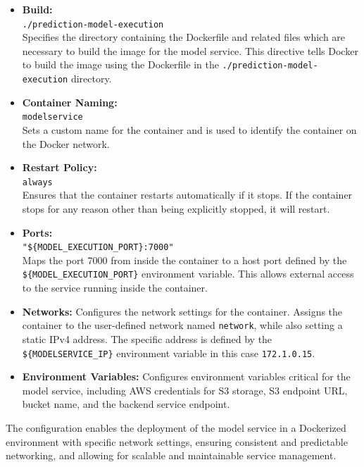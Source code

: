 \begin{itemize}
    \item \textbf{Build:} \\ \verb|./prediction-model-execution| \\ Specifies the directory containing the Dockerfile and related files which are necessary to build the image for the model service. This directive tells Docker to build the image using the Dockerfile in the \texttt{./prediction-model-execution} directory.

    \item \textbf{Container Naming:} \\ \verb|modelservice| \\ Sets a custom name for the container and is used to identify the container on the Docker network.

    \item \textbf{Restart Policy:} \\ \verb|always| \\ Ensures that the container restarts automatically if it stops. If the container stops for any reason other than being explicitly stopped, it will restart.

    \item \textbf{Ports:} \\ \verb|"${MODEL_EXECUTION_PORT}:7000"| \\ Maps the port 7000 from inside the container to a host port defined by the \texttt{\$\{MODEL\_EXECUTION\_PORT\}} environment variable. This allows external access to the service running inside the container.

    \item \textbf{Networks:} Configures the network settings for the container.  Assigns the container to the user-defined network named \texttt{network}, while also setting a static IPv4 address. The specific address is defined by the \texttt{\$\{MODELSERVICE\_IP\}} environment variable in this case \texttt{172.1.0.15}.

     \item \textbf{Environment Variables:} Configures environment variables critical for the model service, including AWS credentials for S3 storage, S3 endpoint URL, bucket name, and the backend service endpoint.
\end{itemize}

The configuration enables the deployment of the model service in a Dockerized environment with specific network settings, ensuring consistent and predictable networking, and allowing for scalable and maintainable service management. \\

